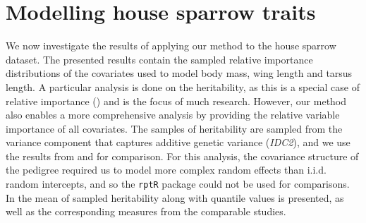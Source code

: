 \section{Modelling house sparrow traits}
\label{sec:heritability_results}
We now investigate the results of applying our method to the house sparrow dataset. The presented results contain the sampled relative importance distributions of the covariates used to model body mass, wing length and tarsus length. A particular analysis is done on the heritability, as this is a special case of relative importance () and is the focus of much research. However, our method also enables a more comprehensive analysis by providing the relative variable importance of all covariates. The samples of heritability are sampled from the variance component that captures additive genetic variance (\textit{IDC2}), and we use the results from \citet{Silva2017} and \citet{Muff2019Genetic} for comparison. For this analysis, the covariance structure of the pedigree required us to model more complex random effects than i.i.d. random intercepts, and so the \texttt{rptR} package could not be used for comparisons. In  the mean of sampled heritability along with quantile values is presented, as well as the corresponding measures from the comparable studies.
